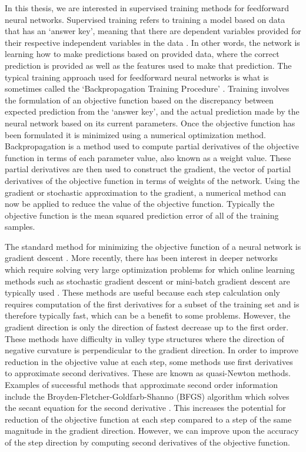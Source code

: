 \documentclass[letterpaper,12pt,titlepage,oneside,final]{book}
\begin{document}
	In this thesis, we are interested in supervised training methods for feedforward neural networks. Supervised training refers to training a model based on data that has an `answer key', meaning that there are dependent variables provided for their respective independent variables in the data \cite{hastie2009overview}. In other words, the network is learning how to make predictions based on provided data, where the correct prediction is provided as well as the features used to make that prediction. The typical training approach used for feedforward neural networks is what is sometimes called the `Backpropagation Training Procedure' \cite{priddy2005artificial}. Training involves the formulation of an objective function based on the discrepancy between expected prediction from the `answer key', and the actual prediction made by the neural network based on its current parameters. Once the objective function has been formulated it is minimized using a numerical optimization method. Backpropagation is a method used to compute partial derivatives of the objective function in terms of each parameter value, also known as a weight value. These partial derivatives are then used to construct the gradient, the vector of partial derivatives of the objective function in terms of weights of the network. Using the gradient or stochastic approximation to the gradient, a numerical method can now be applied to reduce the value of the objective function. Typically the objective function is the mean squared prediction error of all of the training samples. 
	
	The standard method for minimizing the objective function of a neural network is gradient descent  \cite{neural1}\cite{neural2}. More recently, there has been interest in deeper networks which require solving very large optimization problems for which online learning methods such as stochastic gradient descent or mini-batch gradient descent are typically used \cite{gulcehre2017robust}\cite{simpson2015oddball}. These methods are useful because each step calculation only requires computation of the first derivatives for a subset of the training set and is therefore typically fast, which can be a benefit to some problems. However, the gradient direction is only the direction of fastest decrease up to the first order. These methods have difficulty in valley type structures where the direction of negative curvature is perpendicular to the gradient direction. In order to improve reduction in the objective value at each step, some methods use first derivatives to approximate second derivatives. These are known as quasi-Newton methods. Examples of successful methods that approximate second order information include the Broyden-Fletcher-Goldfarb-Shanno (BFGS) algorithm which solves the secant equation for the second derivative \cite{Shepherd.1997}. This increases the potential for reduction of the objective function at each step compared to a step of the same magnitude in the gradient direction. However, we can improve upon the accuracy of the step direction by computing second derivatives of the objective function.
	
\end{document}
